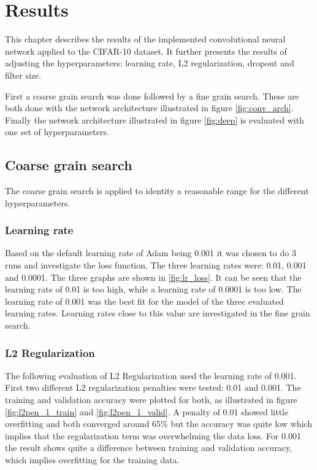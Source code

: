 \chapter{Results}
\label{chp:res}

This chapter describes the results of the implemented convolutional neural network applied to the CIFAR-10 dataset. It further presents the results of adjusting the hyperparameters: learning rate, L2 regularization, dropout and filter size.

First a coarse grain search was done followed by a fine grain search. These are both done with the network architecture illustrated in figure \ref{fig:conv_arch}. Finally the network architecture illustrated in figure \ref{fig:deep} is evaluated with one set of hyperparameters. 

\section{Coarse grain  search}
The coarse grain search is applied to identity a reasonable range for the different hyperparameters.

\subsection{Learning rate}
Based on the default learning rate of Adam being 0.001 it was chosen to do 3 runs and investigate the loss function. The three learning rates were: 0.01, 0.001 and 0.0001. The three graphs are shown in \ref{fig:lr_loss}. It can be seen that the learning rate of 0.01 is too high, while a learning rate of 0.0001 is too low. The learning rate of 0.001 was the best fit for the model of the three evaluated learning rates. Learning rates close to this value are investigated in the fine grain search.
	

\FloatBarrier
\subsection{L2 Regularization}
The following evaluation of L2 Regularization used the learning rate of 0.001. First two different L2 regularization penalties were tested: 0.01 and 0.001. The training and validation accuracy were plotted for both, as illustrated in figure \ref{fig:l2pen_1_train} and \ref{fig:l2pen_1_valid}. A penalty of 0.01 showed little overfitting and both converged around 65\% but the accuracy was quite low which implies that the regularization term was overwhelming the data loss. For 0.001 the result shows quite a difference between training and validation accuracy, which implies overfitting for the training data. 

